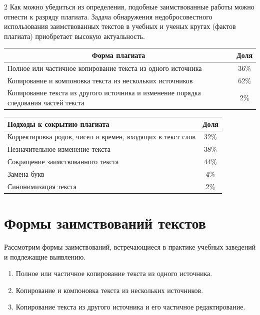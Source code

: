 \begin{multicols}{2}
  Как можно убедиться из определения, подобные заимствованные работы 
можно отнести к разряду плагиата. Задача обнаружения недобросовестного 
использования заимствованных текстов в учебных и ученых кругах (фактов 
плагиата) приобретает высокую актуальность.

\begin{table}\small
\begin{center}
\vspace*{2ex}

\begin{tabular}{|l|c|}
\hline
\multicolumn{1}{|c|}{Форма плагиата}&Доля\\
\hline
Полное или частичное копирование текста из одного источника&36\%\\
Копирование и компоновка текста из нескольких источников&62\%\\
Копирование текста из другого источника и изменение порядка следования частей 
текста&\hphantom{9}2\%\\
\hline
\end{tabular}
\end{center}
\begin{center}
\vspace*{2ex}

\tabcolsep=8pt
\begin{tabular}{|l|c|}
\hline
Подходы к сокрытию плагиата&Доля\\
\hline
Корректировка родов, чисел и времен, входящих в текст слов&32\%\\
Незначительное изменение текста&38\%\\
Сокращение заимствованного текста&44\%\\
Замена букв&\hphantom{9}4\%\\
Синонимизация текста&\hphantom{9}2\%\\
\hline
\end{tabular}
\end{center}
\end{table}

\section{Формы заимствований текстов}

  Рассмотрим формы заимствований, встре\-ча\-ющи\-еся в практике учебных 
заведений и подлежащие выявлению. 
  \begin{enumerate}[1.]
  \item Полное или частичное копирование текста из одного источника. 
  \item Копирование и компоновка текста из нескольких источников.
  \item Копирование текста из другого источника и его частичное 
редактирование.
  \end{enumerate}
  

\end{multicols}
